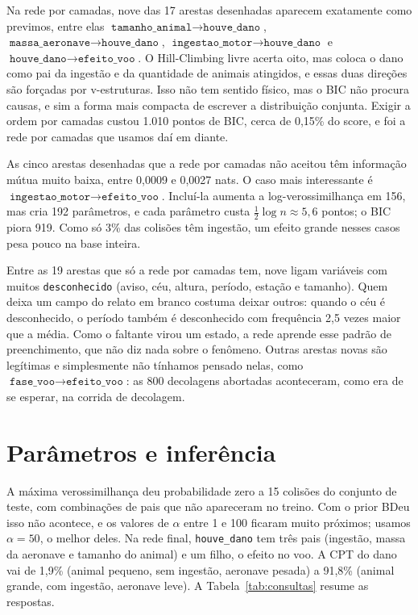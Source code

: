 \documentclass[10pt,a4paper,twocolumn]{article}
\newcommand{\var}[1]{\texttt{#1}}
\begin{document}
Na rede por camadas, nove das 17 arestas desenhadas aparecem exatamente como previmos, entre elas
$\var{tamanho\_animal}\to\var{houve\_dano}$, $\var{massa\_aeronave}\to\var{houve\_dano}$,
$\var{ingestao\_motor}\to\var{houve\_dano}$ e $\var{houve\_dano}\to\var{efeito\_voo}$. O Hill-Climbing livre acerta
oito, mas coloca o dano como pai da ingestão e da quantidade de animais atingidos, e essas duas direções são forçadas por
v-estruturas. Isso não tem sentido físico, mas o BIC não procura causas, e sim a forma mais compacta de escrever a
distribuição conjunta. Exigir a ordem por camadas custou 1.010 pontos de BIC, cerca de 0,15\% do score, e foi a rede
por camadas que usamos daí em diante.

As cinco arestas desenhadas que a rede por camadas não aceitou têm informação mútua muito baixa,
entre 0,0009 e 0,0027 nats. O caso mais interessante é $\var{ingestao\_motor}\to\var{efeito\_voo}$. Incluí-la aumenta a
log-verossimilhança em 156, mas cria 192 parâmetros, e cada parâmetro custa $\tfrac{1}{2}\log n\approx 5{,}6$ pontos; o
BIC piora 919. Como só 3\% das colisões têm ingestão, um efeito grande nesses casos pesa pouco na base inteira.

Entre as 19 arestas que só a rede por camadas tem, nove ligam variáveis com muitos \var{desconhecido} (aviso, céu,
altura, período, estação e tamanho). Quem deixa um campo do relato em branco costuma deixar outros: quando o céu é
desconhecido, o período também é desconhecido com frequência 2,5 vezes maior que a média. Como o faltante virou um
estado, a rede aprende esse padrão de preenchimento, que não diz nada sobre o fenômeno. Outras arestas novas são
legítimas e simplesmente não tínhamos pensado nelas, como $\var{fase\_voo}\to\var{efeito\_voo}$: as 800 decolagens
abortadas aconteceram, como era de se esperar, na corrida de decolagem.

\section{Parâmetros e inferência}

A máxima verossimilhança deu probabilidade zero a 15 colisões do conjunto de teste, com combinações de pais que não
apareceram no treino. Com o prior BDeu isso não acontece, e os valores de $\alpha$ entre 1 e 100 ficaram muito
próximos; usamos $\alpha=50$, o melhor deles. Na rede final, \var{houve\_dano} tem três pais (ingestão, massa da
aeronave e tamanho do animal) e um filho, o efeito no voo. A CPT do dano vai de 1,9\% (animal pequeno, sem ingestão,
aeronave pesada) a 91,8\% (animal grande, com ingestão, aeronave leve). A Tabela~\ref{tab:consultas} resume as
respostas.
\end{document}
